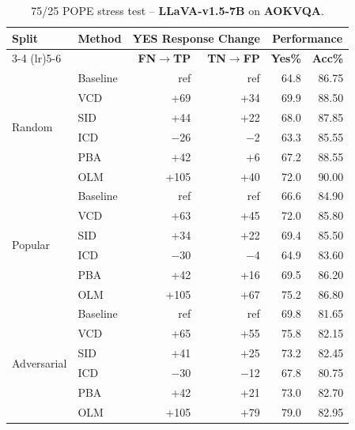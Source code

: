 \documentclass[11pt]{article}
\begin{document}
\begin{table}[ht]
\centering
\caption{75/25 POPE stress test -- \textbf{LLaVA-v1.5-7B} on \textbf{AOKVQA}.}
\label{tab:75_25_llava_aokvqa}
\setlength{\tabcolsep}{6pt}
\renewcommand{\arraystretch}{1.1}
\begin{tabular}{l|l|rr|rr}
\toprule
\multirow{2}{*}{\textbf{Split}} &
\multirow{2}{*}{\textbf{Method}} &
\multicolumn{2}{c|}{\textbf{YES Response Change}} &
\multicolumn{2}{c}{\textbf{Performance}} \\
\cmidrule(lr){3-4} \cmidrule(lr){5-6}
& & \textbf{FN$\to$TP} & \textbf{TN$\to$FP} & \textbf{Yes\%} & \textbf{Acc\%} \\
\midrule

\multirow{6}{*}{Random}
& Baseline & ref    & ref   & 64.8 & 86.75 \\
& VCD      & +69    & +34   & 69.9 & 88.50 \\
& SID      & +44    & +22   & 68.0 & 87.85 \\
& ICD      & $-$26  & $-$2  & 63.3 & 85.55 \\
& PBA      & +42    & +6    & 67.2 & 88.55 \\
& OLM      & +105   & +40   & 72.0 & 90.00 \\
\midrule

\multirow{6}{*}{Popular}
& Baseline & ref    & ref   & 66.6 & 84.90 \\
& VCD      & +63    & +45   & 72.0 & 85.80 \\
& SID      & +34    & +22   & 69.4 & 85.50 \\
& ICD      & $-$30  & $-$4  & 64.9 & 83.60 \\
& PBA      & +42    & +16   & 69.5 & 86.20 \\
& OLM      & +105   & +67   & 75.2 & 86.80 \\
\midrule

\multirow{6}{*}{Adversarial}
& Baseline & ref    & ref   & 69.8 & 81.65 \\
& VCD      & +65    & +55   & 75.8 & 82.15 \\
& SID      & +41    & +25   & 73.2 & 82.45 \\
& ICD      & $-$30  & $-$12 & 67.8 & 80.75 \\
& PBA      & +42    & +21   & 73.0 & 82.70 \\
& OLM      & +105   & +79   & 79.0 & 82.95 \\
\bottomrule
\end{tabular}
\end{table}
\end{document}

